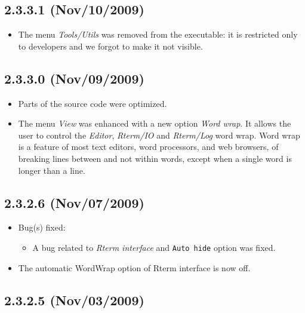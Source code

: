 \subsection{2.3.3.1 (Nov/10/2009)}

\begin{itemize}
  \item The menu \textit{Tools/Utils} was removed from the executable:
    it is restricted only to developers and we forgot to make it not
    visible.
\end{itemize}


\subsection{2.3.3.0 (Nov/09/2009)}

\begin{itemize}
  \item Parts of the source code were optimized.
  \item The menu \textit{View} was enhanced with a new option \textit{Word wrap}.
    It allows the user to control the \textit{Editor}, \textit{Rterm/IO} and
    \textit{Rterm/Log} word wrap. Word wrap is a feature of most text editors,
    word processors, and web browsers, of breaking lines between and not within
    words, except when a single word is longer than a line.
\end{itemize}


\subsection{2.3.2.6 (Nov/07/2009)}

\begin{itemize}
  \item Bug(s) fixed:
    \begin{itemize}
      \item A bug related to \textit{Rterm interface} and \texttt{Auto hide} option
        was fixed.
    \end{itemize}
  \item The automatic WordWrap option of Rterm interface is now off.
\end{itemize}


\subsection{2.3.2.5 (Nov/03/2009)}

